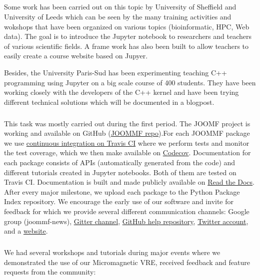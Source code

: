 \subparagraph{}

Some work has been carried out on this topic by University of Sheffield and University of Leeds which can be seen by 
the many training activities  and wokshops that have been organized on various topics (bioinformatic, HPC, Web data). 
The goal is to introduce the Jupyter notebook to researchers and teachers of various scientific fields. A frame work
has also been built to allow teachers to easily create a course website based on Jupyer.

Besides, the University Paris-Sud has been experimenting teaching C++ programming using Jupyter on a big scale course
of 400 students. They have been working closely with the developers of the C++ kernel and have been trying different
technical solutions which will be documented in a blogpost.

\subparagraph{}
\label{dissem@dissemination-of-oommf-nb-virtual-environment}

This task was mostly carried out during the first period. The JOOMF project is working and available on GitHub 
(\href{https://github.com/joommf}{JOOMMF repo}).For each JOOMMF package we use \href{https://travis-ci.org/joommf/discretisedfield}{continuous integration on Travis CI} where we perform tests and monitor the test coverage, which we then make available on \href{https://codecov.io/}{Codecov}. Documentation for each package consists of APIs (automatically generated from the code) and different tutorials created in Jupyter notebooks. Both of them are tested on Travis CI. Documentation is built and made publicly available on \href{http://discretisedfield.readthedocs.io}{Read the Docs}. After every major milestone, we upload each package to the Python Package Index repository. We encourage the early use of our software and invite for feedback for which we provide several different communication channels: Google group (joommf-news), \href{https://gitter.im/joommf/}{Gitter channel}, \href{https://github.com/joommf/help}{GitHub help repository}, \href{https://twitter.com/joommf}{Twitter account}, and a \href{http://joommf.github.io/}{website}.

\subparagraph{}
\label{dissem@dissemination-of-oommf-nb-workshops}

We had several workshops and tutorials during major events where we demonstrated the use of our Micromagnetic VRE, received feedback and feature requests from the community:

